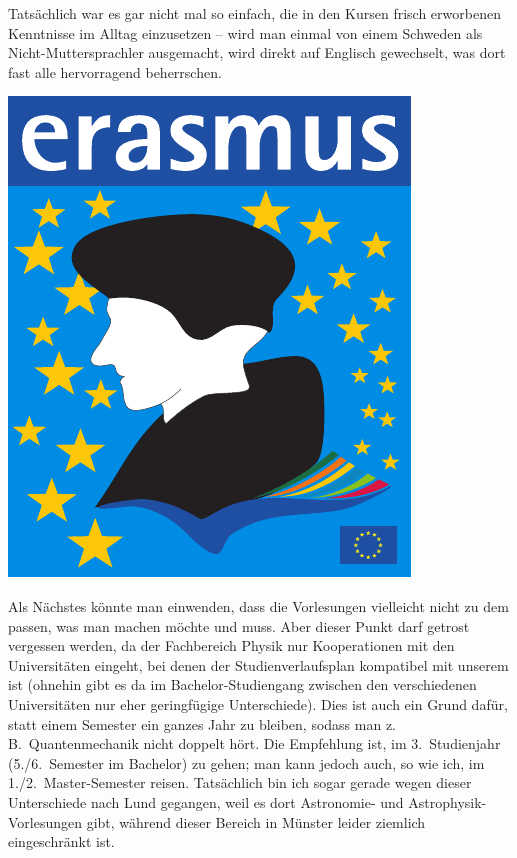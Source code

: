 \begin{multicols}{2}
Tatsächlich war es gar nicht mal so einfach, die in den Kursen frisch erworbenen Kenntnisse im Alltag einzusetzen – wird man einmal von einem Schweden als Nicht-Muttersprachler ausgemacht, wird direkt auf Englisch gewechselt, was dort fast alle hervorragend beherrschen.

\begin{center}
	\includegraphics[width=\columnwidth]{res/erasmus_logo.pdf}
\end{center}

Als Nächstes könnte man einwenden, dass die Vorlesungen vielleicht nicht zu dem passen, was man machen möchte und muss.
Aber dieser Punkt darf getrost vergessen werden, da der Fachbereich Physik nur Kooperationen mit den Universitäten eingeht, bei denen der Studienverlaufsplan kompatibel mit unserem ist (ohnehin gibt es da im Bachelor-Studiengang zwischen den verschiedenen Universitäten nur eher geringfügige Unterschiede).
Dies ist auch ein Grund dafür, statt einem Semester ein ganzes Jahr zu bleiben, sodass man z.\,B.\ Quantenmechanik nicht doppelt hört.
Die Empfehlung ist, im 3.~Studienjahr (5./6.~Semester im Bachelor) zu gehen; man kann jedoch auch, so wie ich, im 1./2.~Master-Semester reisen.
Tatsächlich bin ich sogar gerade wegen dieser Unterschiede nach Lund gegangen, weil es dort Astronomie- und Astrophysik-Vorlesungen gibt, während dieser Bereich in Münster leider ziemlich eingeschränkt ist.


\end{multicols}

